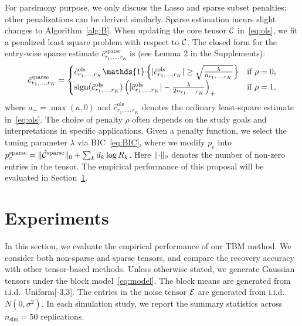 \documentclass[11pt]{article}
\theoremstyle{plain}
\theoremstyle{definition}
\begin{document}
For parsimony purpose, we only discuss the Lasso and sparse subset penalties; other penalizations can be derived similarly. Sparse estimation incurs slight changes to Algorithm~\ref{alg:B}. When updating the core tensor $\mathcal{C}$ in~\eqref{eq:ols}, we fit a penalized least square problem with respect to $\mathcal{C}$. 
The closed form for the entry-wise sparse estimate $\hat c^{\text{sparse}}_{r_1,\ldots,r_K}$ is (see Lemma 2 in the Supplements):
\begin{equation}\label{eq:lasso}
\hat c^{\text{sparse}}_{r_1,\ldots,r_K}=
\begin{cases}
\hat c^{\text{ols}}_{r_1,\ldots,r_K}\mathds{1}\left\{|\hat c^{\text{ols}}_{r_1,\ldots,r_K} |\geq {\sqrt{\lambda \over n_{r_1,\ldots,r_K}}}\right\} & \text{if}\ \rho=0,\\
\text{sign}(\hat c^{\text{ols}}_{r_1,\ldots,r_K})\left(| \hat c^{\text{ols}}_{r_1,\ldots,r_K}|-{\lambda \over 2n_{r_1,\ldots,r_K}}  \right)_{+} &\text{if}\ \rho=1,
\end{cases}
\end{equation}
where $a_{+}=\max(a,0)$ and $\hat c^{\text{ols}}_{r_1,\ldots,r_K}$ denotes the ordinary least-square estimate in~\eqref{eq:ols}. The choice of penalty $\rho$ often depends on the study goals and interpretations in specific applications. Given a penalty function, we select the tuning parameter $\lambda$ via BIC~\eqref{eq:BIC}, where we modify $p_e$ into $p^{\text{sparse}}_e=\lVert\hat {\mathcal{C}}^{\text{sparse}}\rVert_0+\sum_kd_k\log R_k$. Here $\lVert\cdot\rVert_0$ denotes the number of non-zero entries in the tensor. The empirical performance of this proposal will be evaluated in Section~\ref{sec:simulation}. 


\section{Experiments}\label{sec:simulation}

In this section, we evaluate the empirical performance of our TBM method. We consider both non-sparse and sparse tensors, and compare the recovery accuracy with other tensor-based methods. Unless otherwise stated, we generate Gaussian tensors under the block model~\eqref{eq:model}. The block means are generated from  i.i.d.\ Uniform[-3,3]. The entries in the noise tensor $\mathcal{E}$ are generated from i.i.d.\ $N(0,\sigma^2)$. In each simulation study, we report the summary statistics across $n_{\text{sim}}=50$ replications. 
\end{document}

